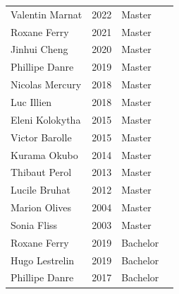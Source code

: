 \documentclass[10pt]{article}
\begin{document}
\begin{table}[h!]
\begin{tabular}{L{4cm}L{3cm}L{2cm}D{6cm}}
\color{gray}Valentin Marnat	  	  & 2022              &  Master     &  \\
\color{gray}Roxane Ferry    	  	  & 2021              &  Master     &  \\
\color{gray}Jinhui Cheng    	      & 2020              &  Master     &  \\
\color{gray}Phillipe Danre    	  & 2019              &  Master     &  \\
\color{gray}Nicolas Mercury    	  & 2018              &  Master     &  \\
\color{gray}Luc Illien      	      & 2018              &  Master     &  \\
\color{gray}Eleni Kolokytha    	  & 2015              &  Master     &  \\
\color{gray}Victor Barolle    	  & 2015              &  Master     &  \\
\color{gray}Kurama Okubo      	  & 2014              &  Master     &  \\
\color{gray}Thibaut Perol      	  & 2013              &  Master     &  \\
\color{gray}Lucile Bruhat      	  & 2012              &  Master     &  \\
\color{gray}Marion Olives      	  & 2004              &  Master     &  \\
\color{gray}Sonia Fliss      	  & 2003              &  Master     &  \\[16pt]
\color{gray}Roxane Ferry    	      & 2019              &  Bachelor   &  \\
\color{gray}Hugo Lestrelin    	  & 2019              &  Bachelor   &  \\
\color{gray}Phillipe Danre    	  & 2017              &  Bachelor   &  \\[12pt]
\end{tabular}
\end{table}\\
\color{black}
\end{document}
